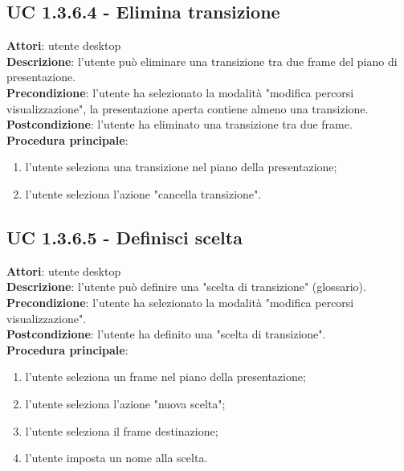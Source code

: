 \subsection{UC 1.3.6.4 - Elimina transizione}{
	\label{uc1.3.6.4}
	\textbf{Attori}: utente desktop \\
	\textbf{Descrizione}: l'utente può eliminare una transizione tra due frame del piano di presentazione. \\
	\textbf{Precondizione}: l'utente ha selezionato la modalità "modifica percorsi visualizzazione", la presentazione aperta contiene almeno una transizione.	\\
	\textbf{Postcondizione}: l'utente ha eliminato una transizione tra due frame.	\\
	\textbf{Procedura principale}:
	\begin{enumerate}
		\item l'utente seleziona una transizione nel piano della presentazione;
		\item l'utente seleziona l'azione "cancella transizione".
	\end{enumerate}
}
\subsection{UC 1.3.6.5 - Definisci scelta}{
	\label{uc1.3.6.5}
	\textbf{Attori}: utente desktop \\
	\textbf{Descrizione}: l'utente può definire una "scelta di transizione" (glossario). \\
	\textbf{Precondizione}: l'utente ha selezionato la modalità "modifica percorsi visualizzazione".	\\
	\textbf{Postcondizione}: l'utente ha definito una "scelta di transizione".	\\
	\textbf{Procedura principale}:
	\begin{enumerate}
		\item l'utente seleziona un frame nel piano della presentazione;
		\item l'utente seleziona l'azione "nuova scelta";
		\item l'utente seleziona il frame destinazione;
		\item l'utente imposta un nome alla scelta.
	\end{enumerate}
}
